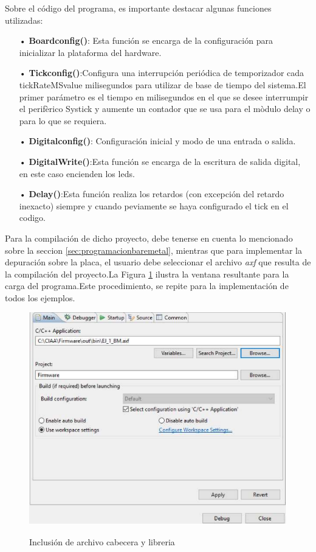 \documentclass[12pt,letterpaper]{article}
\begin{document}
Sobre el código del programa, es importante destacar algunas funciones utilizadas:

\begin{enumerate}
\item[•]\textbf{Boardconfig()}: Esta función se encarga de la configuración para inicializar la plataforma del hardware.
\item[•]\textbf{Tickconfig()}:Configura una interrupción periódica de temporizador cada tickRateMSvalue milisegundos para utilizar de base de tiempo del sistema.El primer parámetro es el tiempo en milisegundos en el que se desee interrumpir el perifèrico Systick y aumente un contador que se usa para
el mòdulo delay o para lo que se requiera. 
\item[•]\textbf{Digitalconfig()}: Configuración inicial y modo de una entrada o salida.
\item[•]\textbf{DigitalWrite()}:Esta función se encarga de la escritura de salida digital, en este caso encienden los leds.
\item[•]\textbf{Delay()}:Esta función  realiza los retardos (con excepción del retardo inexacto) siempre y cuando peviamente se haya configurado el tick en el codigo.
\end{enumerate}
Para la compilación de dicho proyecto, debe tenerse en cuenta lo mencionado sobre la seccion \ref{sec:programacionbaremetal}, mientras que para implementar la depuración sobre la placa, el usuario debe seleccionar el archivo \textit{axf} que resulta de la compilación del proyecto.La Figura \ref{Fig21} ilustra la ventana resultante para la carga del programa.Este procedimiento, se repite para la implementación de todos los ejemplos. 

\begin{center}
\begin{figure}[!h]
\centering
\includegraphics[width=6 cm]{figuras/f3.png}\\
\caption{Inclusión de archivo cabecera y libreria}
\label{Fig21}
\end{figure}
\end{center}
\end{document}
